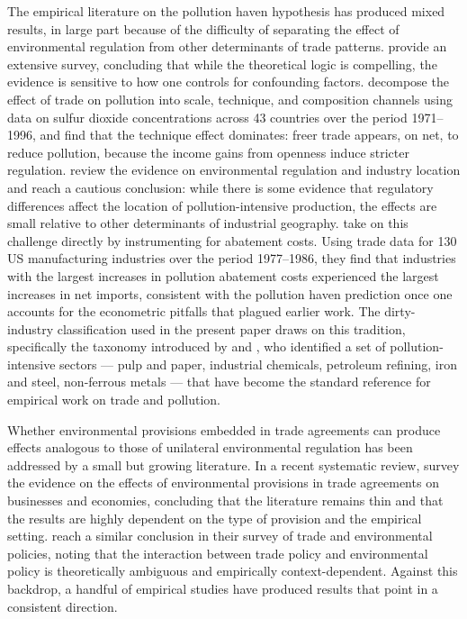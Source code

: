 \documentclass[12pt]{article}
\begin{document}
The empirical literature on the pollution haven hypothesis has produced mixed results, in large part because of the difficulty of separating the effect of environmental regulation from other determinants of trade patterns. \citet{copelandtaylor2004} provide an extensive survey, concluding that while the theoretical logic is compelling, the evidence is sensitive to how one controls for confounding factors. \citet{antweiler2001} decompose the effect of trade on pollution into scale, technique, and composition channels using data on sulfur dioxide concentrations across 43 countries over the period 1971--1996, and find that the technique effect dominates: freer trade appears, on net, to reduce pollution, because the income gains from openness induce stricter regulation. \citet{brunnermeier2004} review the evidence on environmental regulation and industry location and reach a cautious conclusion: while there is some evidence that regulatory differences affect the location of pollution-intensive production, the effects are small relative to other determinants of industrial geography. \citet{levinsontaylor2008} take on this challenge directly by instrumenting for abatement costs. Using trade data for 130 US manufacturing industries over the period 1977--1986, they find that industries with the largest increases in pollution abatement costs experienced the largest increases in net imports, consistent with the pollution haven prediction once one accounts for the econometric pitfalls that plagued earlier work. The dirty-industry classification used in the present paper draws on this tradition, specifically the taxonomy introduced by \citet{mani1998} and \citet{low1992}, who identified a set of pollution-intensive sectors --- pulp and paper, industrial chemicals, petroleum refining, iron and steel, non-ferrous metals --- that have become the standard reference for empirical work on trade and pollution.

Whether environmental provisions embedded in trade agreements can produce effects analogous to those of unilateral environmental regulation has been addressed by a small but growing literature. In a recent systematic review, \citet{gutsch2024} survey the evidence on the effects of environmental provisions in trade agreements on businesses and economies, concluding that the literature remains thin and that the results are highly dependent on the type of provision and the empirical setting. \citet{felbermayr2025} reach a similar conclusion in their survey of trade and environmental policies, noting that the interaction between trade policy and environmental policy is theoretically ambiguous and empirically context-dependent. Against this backdrop, a handful of empirical studies have produced results that point in a consistent direction.
\end{document}
